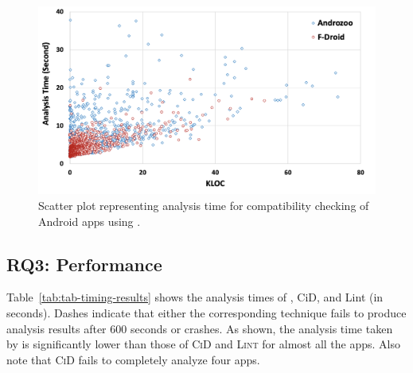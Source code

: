 \begin{figure}[b]
    \centering
    \vspace{-0.5cm}
    \includegraphics[width=0.8\linewidth]{images/scatterplot.png}
    \vspace{-0.4cm}
    \caption{Scatter plot representing analysis time for compatibility checking of Android apps using \@approach.}
    \label{fig:scatterplot}
\end{figure}


\subsection{RQ3: Performance} %

Table~\ref{tab:tab-timing-results} shows the analysis
times of \@approach, {\sc CiD}, and {\sc Lint} (in
seconds).  Dashes indicate that either the
corresponding technique fails to produce analysis
results after 600 seconds or crashes.
As shown, the analysis time taken by \@approach is
significantly lower than those of \textsc{CiD} and
\textsc{Lint} for almost all the apps. Also note that
\textsc{CiD} fails to completely analyze four apps.

